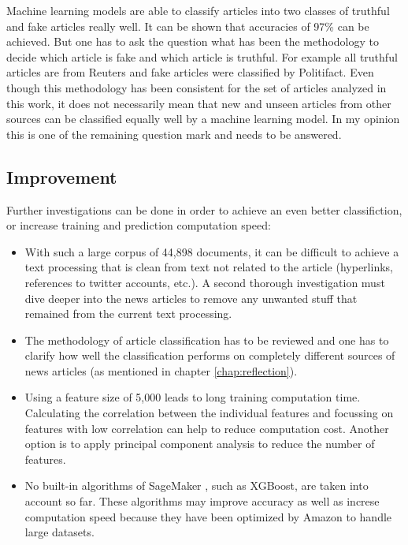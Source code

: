 \documentclass[a4paper,12pt,nottoc]{article}
\begin{document}
Machine learning models are able to classify articles into two classes of truthful and fake articles really well. It can be shown that accuracies of 97\% can be achieved. But one has to ask the question what has been the methodology to decide which article is fake and which article is truthful. For example all truthful articles are from Reuters and fake articles were classified by Politifact. Even though this methodology has been consistent for the set of articles analyzed in this work, it does not necessarily mean that new and unseen articles from other sources can be classified equally well by a machine learning model. In my opinion this is one of the remaining question mark and needs to be answered.

\subsection{Improvement}

Further investigations can be done in order to achieve an even better classifiction, or increase training and prediction computation speed:

\begin{itemize}
\item{With such a large corpus of 44,898 documents, it can be difficult to achieve a text processing that is clean from text not related to the article (hyperlinks, references to twitter accounts, etc.). A second thorough investigation must dive deeper into the news articles to remove any unwanted stuff that remained from the current text processing.}
\item{The methodology of article classification has to be reviewed and one has to clarify how well the classification performs on completely different sources of news articles (as mentioned in chapter \ref{chap:reflection}).}
\item{Using a feature size of 5,000 leads to long training computation time. Calculating the correlation between the individual features and focussing on features with low correlation can help to reduce computation cost. Another option is to apply principal component analysis to reduce the number of features.}
\item{No built-in algorithms of SageMaker \cite{bib:sagemaker}, such as XGBoost, are taken into account so far. These algorithms may improve accuracy as well as increse computation speed because they have been optimized by Amazon to handle large datasets.}
\end{itemize}
\end{document}
